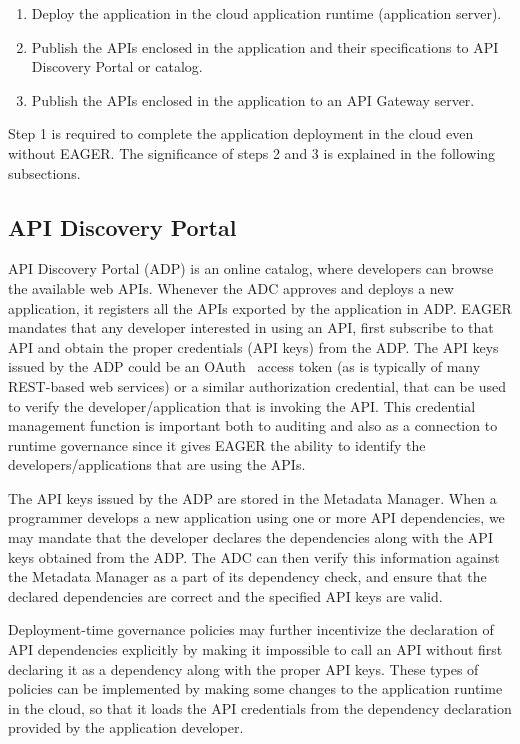 \begin{enumerate}
\item Deploy the application in the cloud application runtime (application server).
\item Publish the APIs enclosed in the application and their specifications to
API Discovery Portal or catalog.
\item Publish the APIs enclosed in the application to an API Gateway server.
\end{enumerate}

Step 1 is required to complete the application deployment in the cloud even without EAGER. The significance of steps 2 and 3 is explained in the 
following subsections.

\subsection{API Discovery Portal} API Discovery Portal (ADP) is an online
catalog, where developers can browse the available web APIs. Whenever the ADC
approves and deploys a new application, it registers all the APIs exported by
the application in ADP.  EAGER mandates that any developer interested in using
an API, first subscribe to that API and obtain the proper credentials (API
keys) from the ADP. The API keys issued by the ADP could be an
OAuth~\cite{oauth2} access
token (as is typically of many REST-based web services) 
or a similar authorization credential, that can be used to verify the
developer/application that is invoking the API. This credential management
function is
important both to auditing and also as a connection to
runtime governance since it gives EAGER the ability to identify
the developers/applications that are using the APIs. 

The API keys issued by the ADP are stored in the Metadata Manager. When a
programmer develops a new application using one or more API dependencies, we
may mandate that the developer declares the dependencies along with the API
keys obtained from the ADP. The ADC can then verify this information against
the Metadata Manager as a part of its dependency check, and ensure that the
declared dependencies are correct and the specified API keys are valid. 

Deployment-time governance policies
may further incentivize the declaration of API 
dependencies explicitly by making it 
impossible to call an API without first declaring it as a dependency along
with the proper API keys. These types of policies can be implemented
by making some changes to the
application runtime in the cloud, so that it loads the API credentials from
the dependency declaration provided by the application developer.

